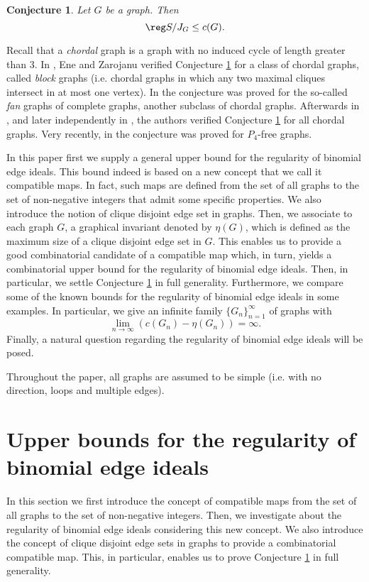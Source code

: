 \documentclass[12pt]{amsart}
\let\to=\rightarrow
\newtheorem{Conjecture}[Theorem]{Conjecture}
\begin{document}
\begin{Conjecture}\label{conj}
Let $G$ be a graph. Then
$$\reg S/J_G\leq c(G).$$
\end{Conjecture}
\par Recall that a \emph{chordal} graph is a graph with no induced cycle of length greater than $3$. In \cite{EZ}, Ene and Zarojanu verified Conjecture \ref{conj} for a class of chordal graphs, called \emph{block} graphs (i.e. chordal graphs in which any two maximal cliques intersect in at most one vertex). In \cite{JK} the conjecture was proved for the so-called \emph{fan} graphs of complete graphs, another subclass of chordal graphs. Afterwards in \cite{RSK}, and later independently in \cite{Kumar2}, the authors verified Conjecture \ref{conj} for all chordal graphs. Very recently, in \cite{KK} the conjecture was proved for $P_4$-free graphs. 
\par In this paper first we supply a general upper bound for the regularity of binomial edge ideals. This bound indeed is based on a new concept that we call it compatible maps. In fact, such maps are defined from the set of all graphs to the set of non-negative integers that admit some specific properties. We also introduce the notion of clique disjoint edge set in graphs. Then, we associate to each graph $G$, a graphical invariant denoted by $\eta(G)$, which is defined as the maximum size of a clique disjoint edge set in $G$. This enables us to provide a good  combinatorial candidate of a compatible map which, in turn, yields a combinatorial upper bound for the regularity of binomial edge ideals. Then, in particular, we settle Conjecture \ref{conj} in full generality.  Furthermore, we compare some of the known bounds for the regularity of binomial edge ideals in some examples. In particular, we give an infinite family $\{G_n\}_{n=1}^{\infty}$ of graphs with 
$$\lim_{n \to \infty}(c(G_n)-\eta(G_n))=\infty.$$
Finally, a natural question regarding the regularity of binomial edge ideals will be posed.  
\par Throughout the paper, all graphs are assumed to be simple (i.e. with no direction, loops and multiple edges).	
	
	
	
	
	
	
\section{Upper bounds for the regularity of binomial edge ideals} 
In this section we first introduce the concept of compatible maps from the set of all graphs to the set of non-negative integers. Then, we investigate about the regularity of binomial edge ideals considering this new concept. We also introduce the concept of clique disjoint edge sets  in graphs to provide a combinatorial compatible map. This, in particular,  enables us to prove Conjecture \ref{conj} in full generality.
\end{document}
